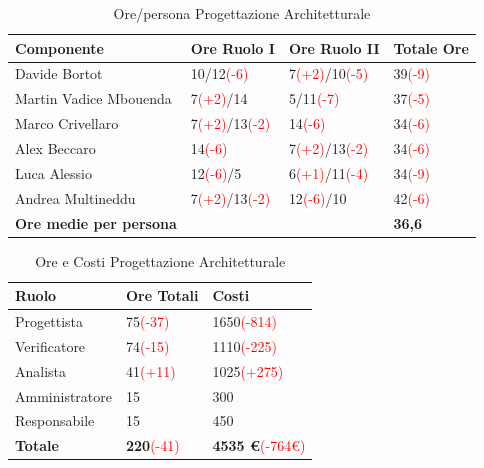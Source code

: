 \documentclass[a4paper,11pt]{article}
\begin{document}
		\begin{table}[h!]			
		\begin{center}
			\begin{tabular}{l l l l}
			\textbf{Componente} & \textbf{Ore Ruolo I} & \textbf{Ore Ruolo II} & \textbf{Totale Ore}\\
			\midrule
			Davide Bortot & 10/12\textcolor{red}{(-6)} & 7\textcolor{red}{(+2)}/10\textcolor{red}{(-5)} & 39\textcolor{red}{(-9)}\\
			Martin Vadice Mbouenda & 7\textcolor{red}{(+2)}/14 & 5/11\textcolor{red}{(-7)} & 37\textcolor{red}{(-5)}\\
			Marco Crivellaro & 7\textcolor{red}{(+2)}/13\textcolor{red}{(-2)} & 14\textcolor{red}{(-6)} & 34\textcolor{red}{(-6)}\\
			Alex Beccaro & 14\textcolor{red}{(-6)} & 7\textcolor{red}{(+2)}/13\textcolor{red}{(-2)} & 34\textcolor{red}{(-6)}\\
			Luca Alessio & 12\textcolor{red}{(-6)}/5 & 6\textcolor{red}{(+1)}/11\textcolor{red}{(-4)} & 34\textcolor{red}{(-9)}\\
			Andrea Multineddu & 7\textcolor{red}{(+2)}/13\textcolor{red}{(-2)} & 12\textcolor{red}{(-6)}/10 & 42\textcolor{red}{(-6)}\\
			\midrule
			\textbf{Ore medie per persona} & & & \textbf{36,6}\\
			\end{tabular}
		\end{center}
		\caption{Ore/persona Progettazione Architetturale}
		\end{table}
		\begin{table}[h!]			
		\begin{center}
			\begin{tabular}{l l l}
			\textbf{Ruolo} & \textbf{Ore Totali} & \textbf{Costi} \\
			\midrule
			Progettista & 75\textcolor{red}{(-37)} & 1650\textcolor{red}{(-814)}\\
			Verificatore & 74\textcolor{red}{(-15)} & 1110\textcolor{red}{(-225)}\\
			Analista & 41\textcolor{red}{(+11)} & 1025\textcolor{red}{(+275)}\\
			Amministratore & 15 & 300\\
			Responsabile & 15 & 450\\
			\midrule
			\textbf{Totale} & \textbf{220}\textcolor{red}{(-41)} & \textbf{4535 \euro}\textcolor{red}{(-764\euro)}\\
			\end{tabular}
		\end{center}
		\caption{Ore e Costi Progettazione Architetturale}
		\end{table}
\end{document}
